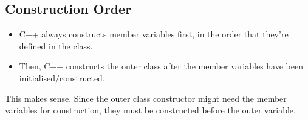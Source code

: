 \documentclass[class=article, crop=false]{standalone}
\begin{document}
  \subsection{Construction Order}
  \begin{itemize}
    \item C++ always constructs member variables first, in the order that they're defined in the class.
    \item Then, C++ constructs the outer class after the member variables have been initialised/constructed.
  \end{itemize}
  \begin{note}{}
    This makes sense. Since the outer class constructor might need the member variables for construction, they must be constructed before the outer variable.
  \end{note}
\end{document}
